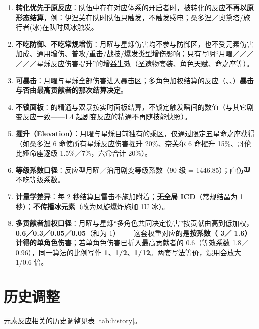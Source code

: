 \begin{enumerate}[start=5]
\item \textbf{转化优先于原反应}：队伍中存在对应体系的开启者时，被转化的反应\textbf{不再以原形态结算}，例：伊涅芙在队时队伍只触发，不触发感电；桑多涅／奥黛塔/旅行者(冰)在队时风冰触发。
\item \textbf{不吃防御、不吃常规增伤}：月曜与星烁伤害均不参与防御区，也不受元素伤害加成、通用增伤、普攻/重击/战技/爆发类型增伤影响；只有写明“月曜／／／／／／星烁反应伤害提升”的增益生效（圣遗物套装、角色天赋、命之座等）。
\item \textbf{可暴击}：月曜与星烁全部伤害进入暴击区；多角色加权结算的反应（、、）\textbf{暴击与否由最高贡献者的那次结算决定}。
\item \textbf{不锁面板}：的精通与双暴按实时面板结算，不锁定触发瞬间的数值（与其它剧变反应一致——1.4 起剧变反应的精通不再随技能快照）。
\item \textbf{擢升（Elevation）}：月曜与星烁目前独有的乘区，仅通过限定五星命之座获得（如桑多涅 6 命使所有星烁反应伤害擢升 20\%、奈芙尔 6 命擢升 15\%、哥伦比娅命座逐级 1.5\%／7\%，六命合计 20\%）。
\item \textbf{等级系数口径}：反应型月曜／沿用剧变等级系数（90 级 = 1446.85）；直伤型不吃等级系数。
\item \textbf{计量学差异}：每 2 秒结算且雷击不施加附着；\textbf{无全局 ICD}（常规结晶为 1 秒）；\textbf{不传播冰元素}（改为风旋爆炸施加 1U 冰）。
\item \textbf{多贡献者加权口径}：月曜与星烁“多角色共同决定伤害”按贡献由高到低加权，\textbf{0.6／0.3／0.05／0.05}（和为 1）——这套权重对应的是\textbf{按系数（ 3／ 1.6）计得的单角色伤害}；若单角色伤害已折入最高贡献者的 0.6（等效系数 1.8／0.96），同一算法的比例写作 \textbf{1、1/2、1/12}。两套写法等价，混用会放大 1/0.6 倍。
\end{enumerate}

\medskip

\section{历史调整}

元素反应相关的历史调整见表 \ref{tab:history}。

